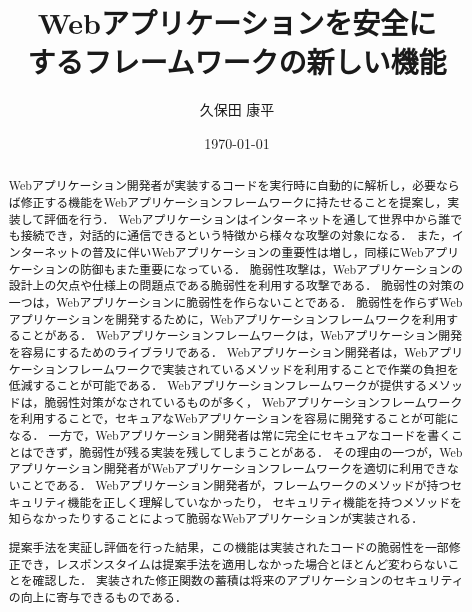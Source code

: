 \documentclass[a4paper,12pt]{jreport}
\title{Webアプリケーションを安全に\\するフレームワークの新しい機能}
\author{久保田 康平}
\date{\today}
\begin{document}
\maketitle

\begin{abstract}
Webアプリケーション開発者が実装するコードを実行時に自動的に解析し，必要ならば修正する機能をWebアプリケーションフレームワークに持たせることを提案し，実装して評価を行う．
Webアプリケーションはインターネットを通して世界中から誰でも接続でき，対話的に通信できるという特徴から様々な攻撃の対象になる．
また，インターネットの普及に伴いWebアプリケーションの重要性は増し，同様にWebアプリケーションの防御もまた重要になっている．
脆弱性攻撃は，Webアプリケーションの設計上の欠点や仕様上の問題点である脆弱性を利用する攻撃である．
脆弱性の対策の一つは，Webアプリケーションに脆弱性を作らないことである．
脆弱性を作らずWebアプリケーションを開発するために，Webアプリケーションフレームワークを利用することがある．
Webアプリケーションフレームワークは，Webアプリケーション開発を容易にするためのライブラリである．
Webアプリケーション開発者は，Webアプリケーションフレームワークで実装されているメソッドを利用することで作業の負担を低減することが可能である．
Webアプリケーションフレームワークが提供するメソッドは，脆弱性対策がなされているものが多く，
Webアプリケーションフレームワークを利用することで，セキュアなWebアプリケーションを容易に開発することが可能になる．
一方で，Webアプリケーション開発者は常に完全にセキュアなコードを書くことはできず，脆弱性が残る実装を残してしまうことがある．
その理由の一つが，Webアプリケーション開発者がWebアプリケーションフレームワークを適切に利用できないことである．
Webアプリケーション開発者が，フレームワークのメソッドが持つセキュリティ機能を正しく理解していなかったり，
セキュリティ機能を持つメソッドを知らなかったりすることによって脆弱なWebアプリケーションが実装される．

提案手法を実証し評価を行った結果，この機能は実装されたコードの脆弱性を一部修正でき，レスポンスタイムは提案手法を適用しなかった場合とほとんど変わらないことを確認した．
実装された修正関数の蓄積は将来のアプリケーションのセキュリティの向上に寄与できるものである．
\end{abstract}

\tableofcontents
\listoffigures
\listoftables
\newpage
{}
\end{document}
